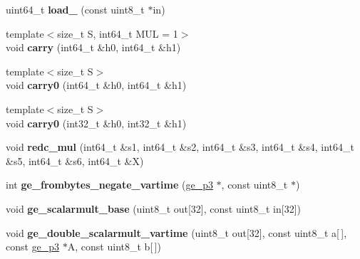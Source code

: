 \begin{DoxyCompactItemize}
uint64\+\_\+t {\bfseries load\+\_} (const uint8\+\_\+t $\ast$in)
\item 
\mbox{\label{namespace_botan_a6aa2a8e6f1bb4378f2923d52e4987d15}} 
{\footnotesize template$<$size\+\_\+t S, int64\+\_\+t M\+UL = 1$>$ }\\void {\bfseries carry} (int64\+\_\+t \&h0, int64\+\_\+t \&h1)
\item 
\mbox{\label{namespace_botan_a31aaf0806b92cd052849c1b5d9e0c817}} 
{\footnotesize template$<$size\+\_\+t S$>$ }\\void {\bfseries carry0} (int64\+\_\+t \&h0, int64\+\_\+t \&h1)
\item 
\mbox{\label{namespace_botan_a264a33bae1766f6ca4cb6625fe85e051}} 
{\footnotesize template$<$size\+\_\+t S$>$ }\\void {\bfseries carry0} (int32\+\_\+t \&h0, int32\+\_\+t \&h1)
\item 
\mbox{\label{namespace_botan_a1fa6d45cedbb7555da6110278b7e1a67}} 
void {\bfseries redc\+\_\+mul} (int64\+\_\+t \&s1, int64\+\_\+t \&s2, int64\+\_\+t \&s3, int64\+\_\+t \&s4, int64\+\_\+t \&s5, int64\+\_\+t \&s6, int64\+\_\+t \&X)
\item 
\mbox{\label{namespace_botan_a9de961f09f7d26e343a2941f4a2730e9}} 
int {\bfseries ge\+\_\+frombytes\+\_\+negate\+\_\+vartime} (\mbox{\hyperlink{struct_botan_1_1ge__p3}{ge\+\_\+p3}} $\ast$, const uint8\+\_\+t $\ast$)
\item 
\mbox{\label{namespace_botan_a78a7fb99e87bb1169999adf1a522a90e}} 
void {\bfseries ge\+\_\+scalarmult\+\_\+base} (uint8\+\_\+t out\mbox{[}32\mbox{]}, const uint8\+\_\+t in\mbox{[}32\mbox{]})
\item 
\mbox{\label{namespace_botan_af899be8efb17c6b77d3107e185a26600}} 
void {\bfseries ge\+\_\+double\+\_\+scalarmult\+\_\+vartime} (uint8\+\_\+t out\mbox{[}32\mbox{]}, const uint8\+\_\+t a\mbox{[}$\,$\mbox{]}, const \mbox{\hyperlink{struct_botan_1_1ge__p3}{ge\+\_\+p3}} $\ast$A, const uint8\+\_\+t b\mbox{[}$\,$\mbox{]})
\item 
\mbox{\label{namespace_botan_af4fc375792120b2cae2b0b58ec000f2e}} 

\end{DoxyCompactItemize}
